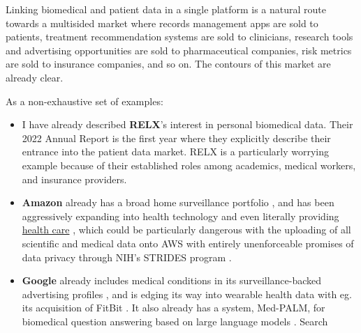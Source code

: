 Linking biomedical and patient data in a single platform is a natural
route towards a multisided market where records management apps are sold
to patients, treatment recommendation systems are sold to clinicians,
research tools and advertising opportunities are sold to pharmaceutical
companies, risk metrics are sold to insurance companies, and so on. The
contours of this market are already clear.

As a non-exhaustive set of examples:

\begin{itemize}

\item
  I have already described \textbf{RELX}'s interest in personal
  biomedical data. Their 2022 Annual Report \cite{relxAnnualReport20222023}  is the first year where they explicitly
  describe their entrance into the patient data market. RELX is a particularly worrying example because of
  their established roles among academics, medical workers, and
  insurance providers.
\item
  \textbf{Amazon} already has a broad home surveillance portfolio \cite{bridgesAmazonRingLargest2021} , and has been aggressively
  expanding into health technology \cite{AWSAnnouncesAWS2021} 
  and even literally providing \href{https://amazon.care/}{health care}
  \cite{fingasAmazonOfficiallyBecomes2023, lermanAmazonBuiltIts2021} , which could be particularly dangerous with the uploading of all
  scientific and medical data onto AWS with entirely unenforceable
  promises of data privacy through NIH's STRIDES program \cite{quinnYouCanTrust2021} .
\item
  \textbf{Google} already includes medical conditions in its
  surveillance-backed advertising profiles \cite{krashinskyGoogleBrokeCanada2014, bharatGeneratingUserInformation2005} , and is edging its way into wearable health data with eg. its
  acquisition of FitBit \cite{bourreauGoogleFitbitWill2020} . It
  also already has a system, Med-PALM, for biomedical question answering
  based on large language models \cite{piferGooglePlansBoost2023, matiasOurLatestHealth2023, singhalLargeLanguageModels2022} . Search

\end{itemize}
